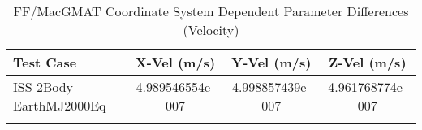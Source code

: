 \begin{table}[htbp!]
\centering
\caption{ FF/MacGMAT Coordinate System Dependent Parameter Differences (Velocity)}
      \begin{tabular}{lccc}
      \hline\hline
          Test Case & X-Vel (m/s) & Y-Vel (m/s) & Z-Vel (m/s) \\
         \hline
         ISS-2Body-EarthMJ2000Eq & 4.989546554e-007 & 4.998857439e-007 & 4.961768774e-007 \\
      \hline\hline
      \label{Table: FF-MacGMAT CS Parameters Set 2} 
\end{tabular}
\end{table}

